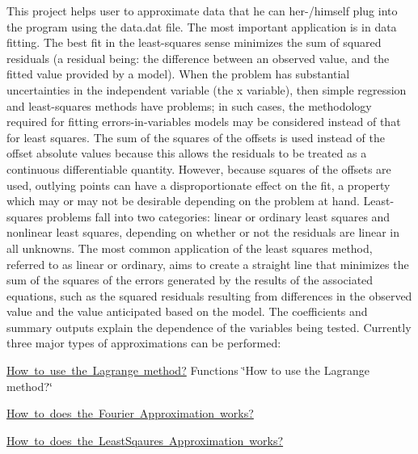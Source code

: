 This project helps user to approximate data that he can her-\//himself plug into the program using the data.\+dat file. The most important application is in data fitting. The best fit in the least-\/squares sense minimizes the sum of squared residuals (a residual being\+: the difference between an observed value, and the fitted value provided by a model). When the problem has substantial uncertainties in the independent variable (the x variable), then simple regression and least-\/squares methods have problems; in such cases, the methodology required for fitting errors-\/in-\/variables models may be considered instead of that for least squares. The sum of the squares of the offsets is used instead of the offset absolute values because this allows the residuals to be treated as a continuous differentiable quantity. However, because squares of the offsets are used, outlying points can have a disproportionate effect on the fit, a property which may or may not be desirable depending on the problem at hand. Least-\/squares problems fall into two categories\+: linear or ordinary least squares and nonlinear least squares, depending on whether or not the residuals are linear in all unknowns. The most common application of the least squares method, referred to as linear or ordinary, aims to create a straight line that minimizes the sum of the squares of the errors generated by the results of the associated equations, such as the squared residuals resulting from differences in the observed value and the value anticipated based on the model. The coefficients and summary outputs explain the dependence of the variables being tested. Currently three major types of approximations can be performed\+:


\begin{DoxyItemize}
\item \mbox{\hyperlink{LagrangePolynomial}{How to use the Lagrange method?}} Functions \char`\"{}\+How to use the Lagrange method?\char`\"{}
\item \mbox{\hyperlink{FourierTransforms}{How to does the Fourier Approximation works?}}
\item \mbox{\hyperlink{LeastSquares}{How to does the Least\+Sqaures Approximation works?}} 
\end{DoxyItemize}